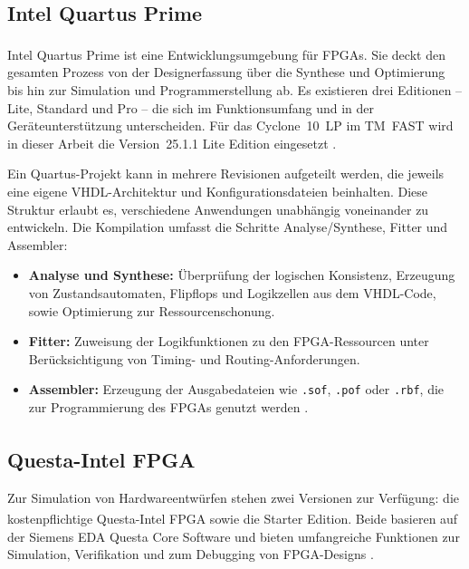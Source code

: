 \subsection{Intel\textsuperscript{\textregistered} Quartus\textsuperscript{\textregistered} Prime}

Intel\textsuperscript{\textregistered} Quartus\textsuperscript{\textregistered} Prime ist eine Entwicklungsumgebung 
für FPGAs. Sie deckt den gesamten Prozess von der Designerfassung über die Synthese und Optimierung 
bis hin zur Simulation und Programmerstellung ab. Es existieren drei Editionen – Lite, Standard und Pro – 
die sich im Funktionsumfang und in der Geräteunterstützung unterscheiden. Für das Cyclone~10~LP im 
TM~FAST wird in dieser Arbeit die Version~25.1.1 Lite Edition eingesetzt \cite{quartus}.  

Ein Quartus-Projekt kann in mehrere Revisionen aufgeteilt werden, die jeweils eine eigene VHDL-Architektur 
und Konfigurationsdateien beinhalten. Diese Struktur erlaubt es, verschiedene Anwendungen unabhängig 
voneinander zu entwickeln. Die Kompilation umfasst die Schritte Analyse/Synthese, Fitter und Assembler:  
\begin{itemize}
    \item \textbf{Analyse und Synthese:} Überprüfung der logischen Konsistenz, Erzeugung von Zustandsautomaten, Flipflops und Logikzellen aus dem VHDL-Code, sowie Optimierung zur Ressourcenschonung.  
    \item \textbf{Fitter:} Zuweisung der Logikfunktionen zu den FPGA-Ressourcen unter Berücksichtigung von Timing- und Routing-Anforderungen.  
    \item \textbf{Assembler:} Erzeugung der Ausgabedateien wie \texttt{.sof}, \texttt{.pof} oder \texttt{.rbf}, die zur Programmierung des FPGAs genutzt werden \cite{intelFPGA_handbook, kick2023}.  
\end{itemize}

\subsection{Questa-Intel\textsuperscript{\textregistered} FPGA}

Zur Simulation von Hardwareentwürfen stehen zwei Versionen zur Verfügung: 
die kostenpflichtige Questa-Intel\textsuperscript{\textregistered} FPGA sowie die Starter Edition. 
Beide basieren auf der Siemens EDA Questa Core Software und bieten umfangreiche Funktionen 
zur Simulation, Verifikation und zum Debugging von FPGA-Designs \cite{questa, kick2023}.  

